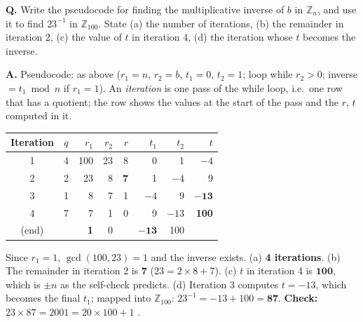 \begin{worked}
\textbf{Q.} Write the pseudocode for finding the multiplicative inverse of $b$ in $\mathbb{Z}_n$, and use it to find $23^{-1}$ in $\mathbb{Z}_{100}$. State (a) the number of iterations, (b) the remainder in iteration 2, (c) the value of $t$ in iteration 4, (d) the iteration whose $t$ becomes the inverse.

\textbf{A.} Pseudocode: as above ($r_1 = n$, $r_2 = b$, $t_1 = 0$, $t_2 = 1$; loop while $r_2 > 0$; inverse $= t_1 \bmod n$ if $r_1 = 1$). An \emph{iteration} is one pass of the while loop, i.e.\ one row that has a quotient; the row shows the values at the start of the pass and the $r$, $t$ computed in it.
\begin{center}\small
\begin{tabular}{@{}c|c|rrr|rrr@{}}
\toprule
Iteration & $q$ & $r_1$ & $r_2$ & $r$ & $t_1$ & $t_2$ & $t$\\
\midrule
1 & 4 & 100 & 23 & 8 & 0 & 1 & $-4$\\
2 & 2 & 23 & 8 & \textbf{7} & 1 & $-4$ & 9\\
3 & 1 & 8 & 7 & 1 & $-4$ & 9 & $\mathbf{-13}$\\
4 & 7 & 7 & 1 & 0 & 9 & $-13$ & \textbf{100}\\
(end) & & \textbf{1} & 0 & & $\mathbf{-13}$ & 100 & \\
\bottomrule
\end{tabular}
\end{center}
Since $r_1 = 1$, $\gcd(100, 23) = 1$ and the inverse exists. (a) \textbf{4 iterations}. (b) The remainder in iteration 2 is $\mathbf{7}$ ($23 = 2 \times 8 + 7$). (c) $t$ in iteration 4 is $\mathbf{100}$, which is $\pm n$ as the self-check predicts. (d) Iteration 3 computes $t = -13$, which becomes the final $t_1$; mapped into $\mathbb{Z}_{100}$: $23^{-1} = -13 + 100 = \mathbf{87}$.
\textbf{Check:} $23 \times 87 = 2001 = 20 \times 100 + 1$ \checkmark.
\end{worked}

